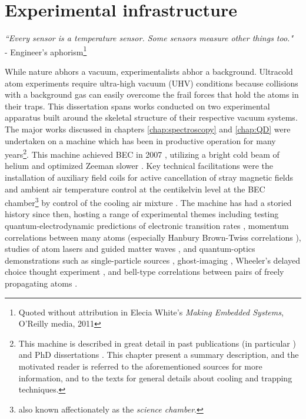 
\chapter{Experimental infrastructure}
	\begin{adjustwidth}{0cm}{0cm}
	\begin{flushright}
	\emph{``Every sensor is a temperature sensor.
	 Some sensors measure other things too."\\} 
	- Engineer's aphorism\footnote{Quoted without attribution in Elecia White's \emph{Making Embedded Systems}, O'Reilly media, 2011}
	\end{flushright}
	\end{adjustwidth}

	While nature abhors a vacuum, experimentalists abhor a background.
	Ultracold atom experiments require ultra-high vacuum (UHV) conditions because collisions with a background gas can easily overcome the frail forces that hold the atoms in their traps.
	This dissertation spans works conducted on two experimental apparatus built around the skeletal structure of their respective vacuum systems.
	The major works discussed in chapters \ref{chap:spectroscopy} and \ref{chap:QD} were undertaken on a machine which has been in productive operation for many years\footnote{This machine is described in great detail in past publications (in particular \cite{Swansson04,Dall07_BEC}) and PhD dissertations \cite{HodgmanThesis,ManningThesis,ShinThesis,DallThesis}.
	This chapter present a summary description, and the motivated reader is referred to the aforementioned sources for more information, and to the texts \cite{FootAtomic,MetVdS} for general details about cooling and trapping techniques.}.
	This machine achieved BEC in 2007 \cite{Dall07_BEC}, utilizing a bright cold beam of helium \cite{Swansson04} and optimized Zeeman slower \cite{Dedman04}.
	Key technical facilitations were the installation of auxiliary field coils for active cancellation of stray magnetic fields \cite{Dedman04} and ambient air temperature control at the centikelvin level at the BEC chamber\footnote{also known affectionately as the \emph{science chamber}.} by control of the cooling air mixture \cite{Dedman15}.
	The machine has had a storied history since then, hosting a range of experimental themes including testing quantum-electrodynamic predictions of electronic transition rates \cite{Dall08}, momentum correlations between many atoms \cite{Hodgman17,Dall13,Manning13} (especially Hanbury Brown-Twiss correlations \cite{Manning10,Dall11a,Hodgman11,Rugway11,Rugway13}), studies of atom lasers \cite{Dall07_laser,Dall08a,Henson18_BCR,Manning10} and guided matter waves \cite{Dall10, Dall11a,Dall11}, and quantum-optics demonstrations such as single-particle sources \cite{Manning14}, ghost-imaging \cite{Khakimov16,Hodgman19}, Wheeler's delayed choice thought experiment \cite{Manning15}, and bell-type correlations between pairs of freely propagating atoms \cite{Shin19}.

